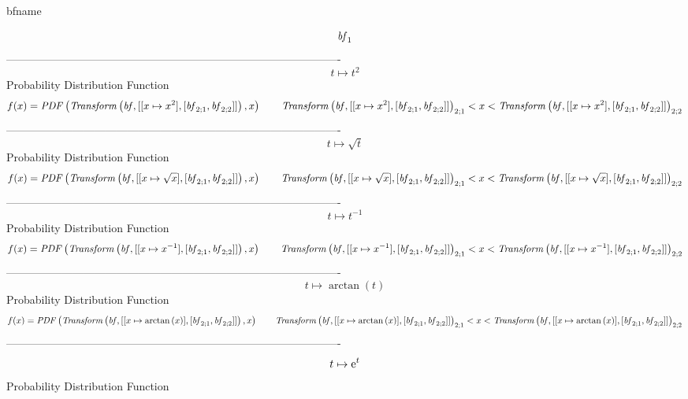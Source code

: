 \documentclass[12pt]{article}
\begin{document}
 
                                   bfname

$${\it bf}_{{1}}
$$-------------------------------------------------------------------------------------------  \\$$t\mapsto {t}^{2}
$$Probability Distribution Function 
$$  f(x)={\it PDF} \left( {\it Transform} \left( {\it bf},[[x\mapsto {x}^{2}],[
{\it bf}_{2;{1}},{\it bf}_{2;{2}}]] \right) ,x \right) 
 \qquad{\it Transform} \left( {\it bf},[[x\mapsto {x}^{2}],[{\it bf}_{2;{1}},
{\it bf}_{2;{2}}]] \right) _{2;{1}}
 < x < {\it Transform} \left( {\it bf},[[x\mapsto {x}^{2}],[{\it bf}_{2;{1}},
{\it bf}_{2;{2}}]] \right) _{2;{2}}
$$-------------------------------------------------------------------------------------------  \\$$t\mapsto \sqrt {t}
$$Probability Distribution Function 
$$  f(x)={\it PDF} \left( {\it Transform} \left( {\it bf},[[x\mapsto \sqrt {x}]
,[{\it bf}_{2;{1}},{\it bf}_{2;{2}}]] \right) ,x \right) 
 \qquad{\it Transform} \left( {\it bf},[[x\mapsto \sqrt {x}],[{\it bf}_{2;{1}
},{\it bf}_{2;{2}}]] \right) _{2;{1}}
 < x < {\it Transform} \left( {\it bf},[[x\mapsto \sqrt {x}],[{\it bf}_{2;{1}
},{\it bf}_{2;{2}}]] \right) _{2;{2}}
$$-------------------------------------------------------------------------------------------  \\$$t\mapsto {t}^{-1}
$$Probability Distribution Function 
$$  f(x)={\it PDF} \left( {\it Transform} \left( {\it bf},[[x\mapsto {x}^{-1}],
[{\it bf}_{2;{1}},{\it bf}_{2;{2}}]] \right) ,x \right) 
 \qquad{\it Transform} \left( {\it bf},[[x\mapsto {x}^{-1}],[{\it bf}_{2;{1}}
,{\it bf}_{2;{2}}]] \right) _{2;{1}}
 < x < {\it Transform} \left( {\it bf},[[x\mapsto {x}^{-1}],[{\it bf}_{2;{1}}
,{\it bf}_{2;{2}}]] \right) _{2;{2}}
$$-------------------------------------------------------------------------------------------  \\$$t\mapsto \arctan \left( t \right) 
$$Probability Distribution Function 
$$  f(x)={\it PDF} \left( {\it Transform} \left( {\it bf},[[x\mapsto \arctan
 \left( x \right) ],[{\it bf}_{2;{1}},{\it bf}_{2;{2}}]] \right) ,x
 \right) 
 \qquad{\it Transform} \left( {\it bf},[[x\mapsto \arctan \left( x \right) ],
[{\it bf}_{2;{1}},{\it bf}_{2;{2}}]] \right) _{2;{1}}
 < x < {\it Transform} \left( {\it bf},[[x\mapsto \arctan \left( x \right) ],
[{\it bf}_{2;{1}},{\it bf}_{2;{2}}]] \right) _{2;{2}}
$$-------------------------------------------------------------------------------------------  \\$$t\mapsto {{\rm e}^{t}}
$$Probability Distribution Function 
\end{document}
